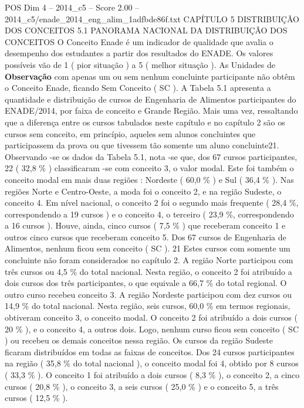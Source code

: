 \begin{textsample}{POS Dim 4 – 2014\_c5 – Score 2.00 – 2014\_c5/enade\_2014\_eng\_alim\_1adfbde86f.txt}  \label{ex:f4_pos_151}
CAPÍTULO 5 DISTRIBUIÇÃO DOS CONCEITOS 5.1 PANORAMA NACIONAL DA DISTRIBUIÇÃO DOS CONCEITOS O Conceito Enade é um indicador de qualidade que avalia o desempenho dos estudantes a partir dos resultados do ENADE.
Os valores possíveis vão de 1 ( pior situação ) a 5 ( melhor situação ).
As Unidades de \textbf{Observação} com apenas um ou sem nenhum concluinte participante não obtêm o Conceito Enade, ficando Sem Conceito ( SC ).
A Tabela 5.1 apresenta a quantidade e distribuição de cursos de Engenharia de Alimentos participantes do ENADE/2014, por faixa de conceito e Grande Região.
Mais uma vez, ressaltando que a diferença entre os cursos tabulados neste capítulo e no capítulo 2 são os cursos sem conceito, em princípio, aqueles sem alunos concluintes que participassem da prova ou que tivessem tão somente um aluno concluinte21.
Observando -se os dados da Tabela 5.1, nota -se que, dos 67 cursos participantes, 22 ( 32,8 \% ) classificaram -se com conceito 3, o valor modal.
Este foi também o conceito modal em mais duas regiões : Nordeste ( 60,0 \% ) e Sul ( 36,4 \% ).
Nas regiões Norte e Centro-Oeste, a moda foi o conceito 2, e na região Sudeste, o conceito 4.
Em nível nacional, o conceito 2 foi o segundo mais frequente ( 28,4 \%, correspondendo a 19 cursos ) e o conceito 4, o terceiro ( 23,9 \%, correspondendo a 16 cursos ).
Houve, ainda, cinco cursos ( 7,5 \% ) que receberam conceito 1 e outros cinco cursos que receberam conceito 5.
Dos 67 cursos de Engenharia de Alimentos, nenhum ficou sem conceito ( SC ). 21 Estes cursos com somente um concluinte não foram considerados no capítulo 2.
A região Norte participou com três cursos ou 4,5 \% do total nacional.
Nesta região, o conceito 2 foi atribuído a dois cursos dos três participantes, o que equivale a 66,7 \% do total regional.
O outro curso recebeu conceito 3.
A região Nordeste participou com dez cursos ou 14,9 \% do total nacional.
Nesta região, seis cursos, 60,0 \% em termos regionais, obtiveram conceito 3, o conceito modal.
O conceito 2 foi atribuído a dois cursos ( 20 \% ), e o conceito 4, a outros dois.
Logo, nenhum curso ficou sem conceito ( SC ) ou recebeu os demais conceitos nessa região.
Os cursos da região Sudeste ficaram distribuídos em todas as faixas de conceitos.
Dos 24 cursos participantes na região ( 35,8 \% do total nacional ), o conceito modal foi 4, obtido por 8 cursos ( 33,3 \% ).
O conceito 1 foi atribuído a dois cursos ( 8,3 \% ), o conceito 2, a cinco cursos ( 20,8 \% ), o conceito 3, a seis cursos ( 25,0 \% ) e o conceito 5, a três cursos ( 12,5 \% ).

\end{textsample}
